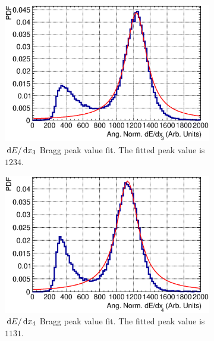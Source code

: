 \begin{figure}[ht]
    \begin{subfigure}{\dbfigwid\textwidth}
         \includegraphics[width=\textwidth]{figures/sel/fig54c.eps}
         \caption{$\,\textrm{d}E/\,\textrm{d}x_3$ Bragg peak value fit. The fitted peak value is $1234$.}
         \label{subfig:dedx2-peak}
    \end{subfigure}
    \begin{subfigure}{\dbfigwid\textwidth}
         \includegraphics[width=\textwidth]{figures/sel/fig54d.eps}
         \caption{$\,\textrm{d}E/\,\textrm{d}x_4$ Bragg peak value fit. The fitted peak value is $1131$.}
         \label{subfig:dedx3-peak}
    \end{subfigure}
    \\
    \begin{subfigure}{\dbfigwid\textwidth}

\end{subfigure}
\end{figure}

